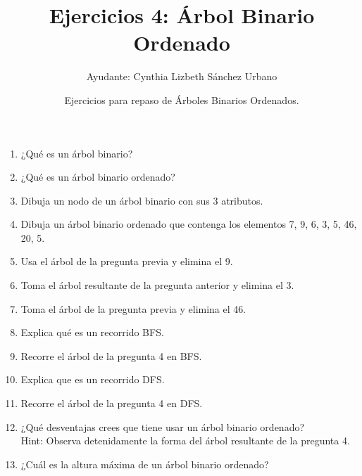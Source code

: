 \documentclass[12pt]{article} %
\begin{document}
\title{Ejercicios 4: Árbol Binario Ordenado}
\author{Ayudante: Cynthia Lizbeth Sánchez Urbano}
\date{Ejercicios para repaso de Árboles Binarios Ordenados.}
\maketitle
\begin{enumerate}
\item ¿Qué es un árbol binario?
\item ¿Qué es un árbol binario ordenado?
\item Dibuja un nodo de un árbol binario con sus 3 atributos.
\item Dibuja un árbol binario ordenado que contenga los elementos 7, 9, 6, 3, 5, 46, 20, 5.
\item Usa el árbol de la pregunta previa y elimina el 9.
\item Toma el árbol resultante de la pregunta anterior y elimina el 3.
\item Toma el árbol de la pregunta previa y elimina el 46.
\item Explica qué es un recorrido BFS.
\item Recorre el árbol de la pregunta 4 en BFS.
\item Explica que es un recorrido DFS.
\item Recorre el árbol de la pregunta 4 en DFS.
\item ¿Qué desventajas crees que tiene usar un árbol binario ordenado?\\
Hint: Observa detenidamente la forma del árbol resultante de la pregunta 4.
\item ¿Cuál es la altura máxima de un árbol binario ordenado?
\end{enumerate}
\end{document}
